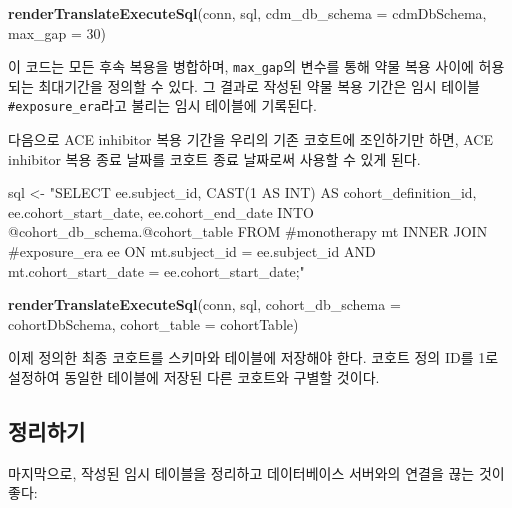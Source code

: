\documentclass[10.5pt]{book}
\newenvironment{Shaded}{\begin{snugshade}}{\end{snugshade}}
\newcommand{\KeywordTok}[1]{\textcolor[rgb]{0.13,0.29,0.53}{\textbf{#1}}}
\newcommand{\DataTypeTok}[1]{\textcolor[rgb]{0.13,0.29,0.53}{#1}}
\newcommand{\DecValTok}[1]{\textcolor[rgb]{0.00,0.00,0.81}{#1}}
\newcommand{\StringTok}[1]{\textcolor[rgb]{0.31,0.60,0.02}{#1}}
\newcommand{\NormalTok}[1]{#1}
\theoremstyle{definition}
\theoremstyle{definition}
\theoremstyle{definition}
\theoremstyle{remark}
\begin{document}
\begin{Shaded}
\begin{Highlighting}[]
\KeywordTok{renderTranslateExecuteSql}\NormalTok{(conn,}
\NormalTok{                          sql,}
                          \DataTypeTok{cdm_db_schema =}\NormalTok{ cdmDbSchema,}
                          \DataTypeTok{max_gap =} \DecValTok{30}\NormalTok{)}
\end{Highlighting}
\end{Shaded}

이 코드는 모든 후속 복용을 병합하며, \texttt{max\_gap}의 변수를 통해
약물 복용 사이에 허용되는 최대기간을 정의할 수 있다. 그 결과로 작성된
약물 복용 기간은 임시 테이블 \texttt{\#exposure\_era}라고 불리는 임시
테이블에 기록된다.

다음으로 ACE inhibitor 복용 기간을 우리의 기존 코호트에 조인하기만 하면,
ACE inhibitor 복용 종료 날짜를 코호트 종료 날짜로써 사용할 수 있게 된다.

\begin{Shaded}
\begin{Highlighting}[]
\NormalTok{sql <-}\StringTok{ "SELECT ee.subject_id,}
\StringTok{  CAST(1 AS INT) AS cohort_definition_id,}
\StringTok{  ee.cohort_start_date,}
\StringTok{  ee.cohort_end_date}
\StringTok{INTO @cohort_db_schema.@cohort_table}
\StringTok{FROM #monotherapy mt}
\StringTok{INNER JOIN #exposure_era ee}
\StringTok{  ON mt.subject_id = ee.subject_id}
\StringTok{    AND mt.cohort_start_date = ee.cohort_start_date;"}

\KeywordTok{renderTranslateExecuteSql}\NormalTok{(conn,}
\NormalTok{                          sql,}
                          \DataTypeTok{cohort_db_schema =}\NormalTok{ cohortDbSchema,}
                          \DataTypeTok{cohort_table =}\NormalTok{ cohortTable)}
\end{Highlighting}
\end{Shaded}

이제 정의한 최종 코호트를 스키마와 테이블에 저장해야 한다. 코호트 정의
ID를 1로 설정하여 동일한 테이블에 저장된 다른 코호트와 구별할 것이다.

\subsection{정리하기}

마지막으로, 작성된 임시 테이블을 정리하고 데이터베이스 서버와의 연결을
끊는 것이 좋다:
\end{document}
